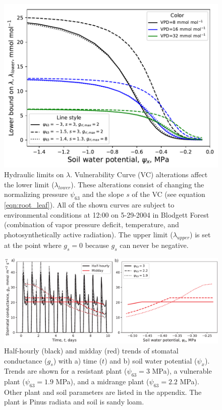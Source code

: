 \documentclass[utf8]{frontiersSCNS} %
\begin{document}
\begin{figure}[h]
    \begin{center}
        \includegraphics[scale=0.75]{lam_psix.pdf}
    \end{center}
    \caption{Hydraulic limits on $\lambda$. Vulnerability Curve (VC) alterations affect the lower limit ($\lambda_{lower}$). These alterations consist of changing the normalizing pressure $\psi_{63}$ and the slope $s$ of the VC (see equation \ref{eqn:root_leaf}). All of the shown curves are subject to environmental conditions at 12:00 on 5-29-2004 in Blodgett Forest (combination of vapor pressure deficit, temperature, and photosynthetically active radiation). The upper limit ($\lambda_{upper}$) is set at the point where $g_s=0$ because $g_s$ can never be negative.}
    \label{fig:lam_lower}
\end{figure}

\begin{figure}[h]
    \begin{center}
         \includegraphics[scale=0.75]{gs_resistant_vulnerable.pdf} 
    \end{center}
    \caption{Half-hourly (black) and midday (red) trends of stomatal conductance ($g_s$) with a) time ($t$) and b) soil water potential ($\psi_x$). Trends are shown for a resistant plant ($\psi_{63} = 3$ MPa), a vulnerable plant ($\psi_{63} = 1.9$ MPa), and a midrange plant ($\psi_{63} = 2.2$ MPa). Other plant and soil parameters are listed in the appendix. The plant is Pinus radiata and soil is sandy loam.}
    \label{fig:resistant_vulnerable_gs}
\end{figure}
\end{document}
